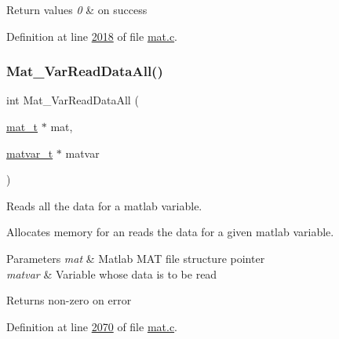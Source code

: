 \begin{DoxyRetVals}{Return values}
{\em 0} & on success \\
\hline
\end{DoxyRetVals}


Definition at line \hyperlink{mat_8c_source_l02018}{2018} of file \hyperlink{mat_8c_source}{mat.\+c}.

\mbox{\label{group___m_a_t_gaa8060d7c8e5da0aa9ee5f96e5f1eb30a}} 
\subsubsection{\texorpdfstring{Mat\+\_\+\+Var\+Read\+Data\+All()}{Mat\_VarReadDataAll()}}
{\footnotesize\ttfamily int Mat\+\_\+\+Var\+Read\+Data\+All (\begin{DoxyParamCaption}\item[{\hyperlink{group___m_a_t_gab0fc888f5a5d79943b16284b1f91c2e8}{mat\+\_\+t} $\ast$}]{mat,  }\item[{\hyperlink{group___m_a_t_structmatvar__t}{matvar\+\_\+t} $\ast$}]{matvar }\end{DoxyParamCaption})}



Reads all the data for a matlab variable. 

Allocates memory for an reads the data for a given matlab variable.


\begin{DoxyParams}{Parameters}
{\em mat} & Matlab M\+AT file structure pointer \\
\hline
{\em matvar} & Variable whose data is to be read \\
\hline
\end{DoxyParams}
\begin{DoxyReturn}{Returns}
non-\/zero on error 
\end{DoxyReturn}


Definition at line \hyperlink{mat_8c_source_l02070}{2070} of file \hyperlink{mat_8c_source}{mat.\+c}.

\mbox{\label{group___m_a_t_gaad61c8449a2106afa697280ff0ee9dd8}} 
